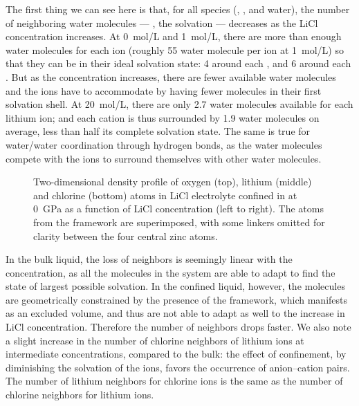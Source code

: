 \documentclass[thesis]{subfiles}
\begin{document}
The first thing we can see here is that, for all species (, ,
and water), the number of neighboring water molecules --- \ie, the solvation ---
decreases as the LiCl concentration increases. At \SI{0}{mol/L} and
\SI{1}{mol/L}, there are more than enough water molecules for each ion (roughly
55 water molecule per ion at \SI{1}{mol/L}) so that they can be in their ideal
solvation state: 4  around each , and 6  around each
. But as the concentration increases, there are fewer available water
molecules and the ions have to accommodate by having fewer molecules in their
first solvation shell. At \SI{20}{mol/L}, there are only 2.7 water molecules
available for each lithium ion; and each cation is thus surrounded by 1.9 water
molecules on average, less than half its complete solvation state. The same is
true for water/water coordination through hydrogen bonds, as the water molecules
compete with the ions to surround themselves with other water molecules.

\begin{figure}[b]
    \centering
    
    \caption{Two-dimensional density profile of oxygen (top), lithium (middle) and
    chlorine (bottom) atoms in LiCl electrolyte confined in  at \SI{0}{GPa}
    as a function of LiCl concentration (left to right). The atoms from the
     framework are superimposed, with some linkers omitted for clarity
    between the four central zinc atoms.}
    \label{fig:licl-zif:density}
\end{figure}

In the bulk liquid, the loss of neighbors is seemingly linear with the
concentration, as all the molecules in the system are able to adapt to find the
state of largest possible solvation. In the confined liquid, however, the
molecules are geometrically constrained by the presence of the  framework,
which manifests as an excluded volume, and thus are not able to adapt as well to
the increase in LiCl concentration. Therefore the number of neighbors drops
faster. We also note a slight increase in the number of chlorine neighbors of
lithium ions at intermediate concentrations, compared to the bulk: the effect of
confinement, by diminishing the solvation of the ions, favors the occurrence of
anion--cation pairs. The number of lithium neighbors for chlorine ions is the
same as the number of chlorine neighbors for lithium ions.
\end{document}
